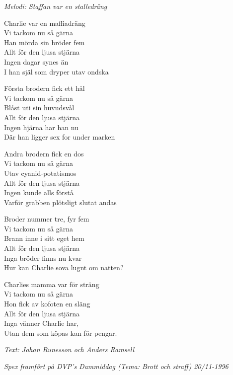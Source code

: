 {\footnotesize\textit{Melodi: Staffan var en stalledräng}}\par
\vspace{10pt}
Charlie var en maffiadräng\\
Vi tackom nu så gärna\\
Han mörda sin bröder fem\\
Allt för den ljusa stjärna\\
Ingen dagar synes än\\
I han själ som dryper utav ondska\par
\vspace{10pt}
Första brodern fick ett hål\\
Vi tackom nu så gärna\\
Blåst uti sin huvudsvål\\
Allt för den ljusa stjärna\\
Ingen hjärna har han nu\\
Där han ligger sex for under marken\par
\vspace{10pt}
Andra brodern fick en dos\\
Vi tackom nu så gärna\\
Utav cyanid-potatismos\\
Allt för den ljusa stjärna\\
Ingen kunde alls förstå\\
Varför grabben plötsligt slutat andas\par
\vspace{10pt}
Broder nummer tre, fyr fem\\
Vi tackom nu så gärna\\
Brann inne i sitt eget hem\\
Allt för den ljusa stjärna\\
Inga bröder finns nu kvar\\
Hur kan Charlie sova lugnt om natten?\par
\vspace{10pt}
Charlies mamma var för sträng\\
Vi tackom nu så gärna\\
Hon fick av kofoten en släng\\
Allt för den ljusa stjärna\\
Inga vänner Charlie har,\\
Utan dem som köpas kan för pengar.\par
\vspace{10pt}
{\footnotesize\textit{Text: Johan Runesson och Anders Ramsell}}\par
\vspace{10pt}
{\footnotesize\textit{Spex framfört på DVP's Dammiddag (Tema: Brott och straff) 20/11-1996}}
